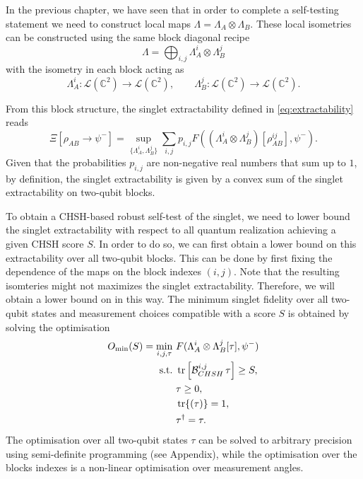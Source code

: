 In the previous chapter, we have seen that in order to complete a self-testing statement we need to construct local maps $\Lambda = \Lambda_A \otimes \Lambda_B$.
These local isometries can be constructed using the same block diagonal recipe 
\begin{equation}
		\Lambda = \bigoplus_{i,j} \Lambda_A^i \otimes \Lambda_B^j
\end{equation}
with the isometry in each block acting as
\begin{equation}
	\Lambda_A^i: \mathcal{L}(\mathds{C}^2) \rightarrow \mathcal{L}(\mathds{C}^2), \qquad \Lambda_B^j: \mathcal{L}(\mathds{C}^2) \rightarrow \mathcal{L}(\mathds{C}^2).
\end{equation}

From this block structure, the singlet extractability defined in \eqref{eq:extractability} reads
\begin{equation}
	\Xi [\rho_{AB} \rightarrow \psi^{-}] = \sup_{\{\Lambda_A^i,\Lambda_B^j\}} \sum_{i,j} p_{i,j} F((\Lambda_A^i \otimes \Lambda_B^j)[\rho_{AB}^{ij}],\psi^{-}).
	\label{eq:block_extractability}
\end{equation}
Given that the probabilities $p_{i,j}$ are non-negative real numbers that sum up to $1$, by definition, the singlet extractability is given by a convex sum of the singlet extractability on two-qubit blocks.

\medbreak

To obtain a CHSH-based robust self-test of the singlet, we need to lower bound the singlet extractability with respect to all quantum realization achieving a given CHSH score $S$.
In order to do so, we can first obtain a lower bound on this extractability over all two-qubit blocks.
This can be done by first fixing the dependence of the maps on the block indexes $(i,j)$.
Note that the resulting isomteries might not maximizes the singlet extractability.
Therefore, we will obtain a lower bound on  in this way.
The minimum singlet fidelity over all two-qubit states and measurement choices compatible with a score $S$ is obtained by solving the optimisation
\begin{equation}
	\begin{split}
		O_{\min}(S)=\min_{i, j, \tau} \-\ & F(\Lambda_A^i \otimes\Lambda_B^j [\tau] ,\psi^-)\\
		\text{s.t.} \-\ &\trr{\mathcal{B}_{CHSH}^{i,j}\, \tau} \geq S,\\
		& \tau \geq 0,\\
		& \tr{(\tau)} =1,\\
		& \tau^\dag = \tau.
	\end{split}
	\label{eq:sdp_extractability}
\end{equation}
The optimisation over all two-qubit states $\tau$ can be solved to arbitrary precision using semi-definite programming (see Appendix), while the optimisation over the blocks indexes is a non-linear optimisation over measurement angles.

